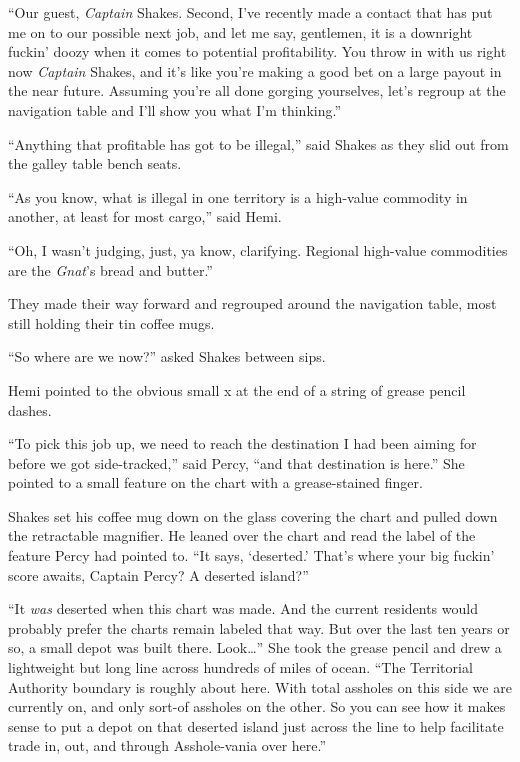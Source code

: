 \documentclass[
]{scrbook}
\begin{document}
``Our guest, \emph{Captain} Shakes. Second, I've recently made a contact
that has put me on to our possible next job, and let me say, gentlemen,
it is a downright fuckin' doozy when it comes to potential
profitability. You throw in with us right now \emph{Captain} Shakes, and
it's like you're making a good bet on a large payout in the near future.
Assuming you're all done gorging yourselves, let's regroup at the
navigation table and I'll show you what I'm thinking.''

``Anything that profitable has got to be illegal,'' said Shakes as they
slid out from the galley table bench seats.

``As you know, what is illegal in one territory is a high-value
commodity in another, at least for most cargo,'' said Hemi.

``Oh, I wasn't judging, just, ya know, clarifying. Regional high-value
commodities are the \emph{Gnat}'s bread and butter.''

They made their way forward and regrouped around the navigation table,
most still holding their tin coffee mugs.

``So where are we now?'' asked Shakes between sips.

Hemi pointed to the obvious small x at the end of a string of grease
pencil dashes.

``To pick this job up, we need to reach the destination I had been
aiming for before we got side-tracked,'' said Percy, ``and that
destination is here.'' She pointed to a small feature on the chart with
a grease-stained finger.

Shakes set his coffee mug down on the glass covering the chart and
pulled down the retractable magnifier. He leaned over the chart and read
the label of the feature Percy had pointed to. ``It says, `deserted.'
That's where your big fuckin' score awaits, Captain Percy? A deserted
island?''

``It \emph{was} deserted when this chart was made. And the current
residents would probably prefer the charts remain labeled that way. But
over the last ten years or so, a small depot was built there.
Look\ldots{}'' She took the grease pencil and drew a lightweight but
long line across hundreds of miles of ocean. ``The Territorial Authority
boundary is roughly about here. With total assholes on this side we are
currently on, and only sort-of assholes on the other. So you can see how
it makes sense to put a depot on that deserted island just across the
line to help facilitate trade in, out, and through Asshole-vania over
here.''
\end{document}
